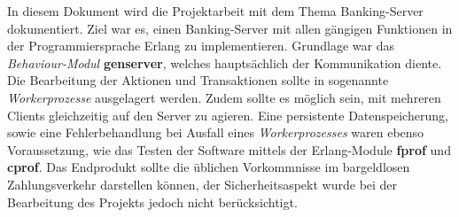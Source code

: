 In diesem Dokument wird die Projektarbeit mit dem Thema Banking-Server dokumentiert. Ziel war es, einen Banking-Server mit allen gängigen Funktionen in der Programmiersprache Erlang zu implementieren. Grundlage war das \textit{Behaviour-Modul} \textbf{gen\textunderscore server}, welches hauptsächlich der Kommunikation diente. Die Bearbeitung der Aktionen und Transaktionen sollte in sogenannte \textit{Workerprozesse} ausgelagert werden. Zudem sollte es möglich sein, mit mehreren Clients gleichzeitig auf den Server zu agieren. Eine persistente Datenspeicherung, sowie eine Fehlerbehandlung bei Ausfall eines \textit{Workerprozesses} waren ebenso Voraussetzung, wie das Testen der Software mittels der Erlang-Module \textbf{fprof} und \textbf{cprof}. Das Endprodukt sollte die üblichen Vorkommnisse im bargeldlosen Zahlungsverkehr darstellen können, der Sicherheitsaspekt wurde bei der Bearbeitung des Projekts jedoch nicht berücksichtigt.
